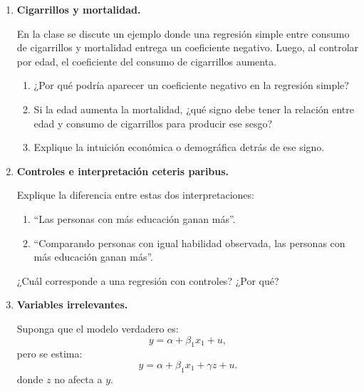 \documentclass[11pt]{article}
\begin{document}
\begin{enumerate}[label=\textbf{Ejercicio \arabic*.}, leftmargin=*]
Se estiman dos modelos para explicar salarios:
\[
\widehat{salario}_i=350000+120000\,educacion_i
\]
y luego:
\[
\widehat{salario}_i=280000+85000\,educacion_i+45000\,habilidad_i.
\]

\begin{enumerate}[label=\alph*)]
    \item ¿Cómo cambia el coeficiente de educación al agregar habilidad?
    \item Si habilidad afecta positivamente al salario, ¿qué sugiere este cambio sobre la relación entre habilidad y educación?
    \item ¿La segunda regresión garantiza una interpretación causal? Justifique.
\end{enumerate}

\item \textbf{Cigarrillos y mortalidad.}

En la clase se discute un ejemplo donde una regresión simple entre consumo de cigarrillos y mortalidad entrega un coeficiente negativo. Luego, al controlar por edad, el coeficiente del consumo de cigarrillos aumenta.

\begin{enumerate}[label=\alph*)]
    \item ¿Por qué podría aparecer un coeficiente negativo en la regresión simple?
    \item Si la edad aumenta la mortalidad, ¿qué signo debe tener la relación entre edad y consumo de cigarrillos para producir ese sesgo?
    \item Explique la intuición económica o demográfica detrás de ese signo.
\end{enumerate}

\item \textbf{Controles e interpretación ceteris paribus.}

Explique la diferencia entre estas dos interpretaciones:
\begin{enumerate}[label=\alph*)]
    \item ``Las personas con más educación ganan más''.
    \item ``Comparando personas con igual habilidad observada, las personas con más educación ganan más''.
\end{enumerate}

¿Cuál corresponde a una regresión con controles? ¿Por qué?

\item \textbf{Variables irrelevantes.}

Suponga que el modelo verdadero es:
\[
y=\alpha+\beta_1x_1+u,
\]
pero se estima:
\[
y=\alpha+\beta_1x_1+\gamma z+u.
\]
donde $z$ no afecta a $y$.


\end{enumerate}
\end{document}
